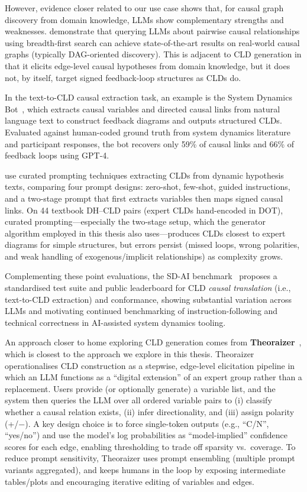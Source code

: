 However, evidence closer related to our use case shows that, for causal graph discovery from domain knowledge, LLMs show complementary strengths and weaknesses. \citet{jiralerspong2024efficientcausalgraphdiscovery} demonstrate that querying LLMs about pairwise causal relationships using breadth-first search can achieve state-of-the-art results on real-world causal graphs (typically DAG-oriented discovery). This is adjacent to CLD generation in that it elicits edge-level causal hypotheses from domain knowledge, but it does not, by itself, target signed feedback-loop structures as CLDs do.

In the text-to-CLD causal extraction task, an example is the System Dynamics Bot~\citep{hosseinichimeh2024textmapdynamicsbot}, which extracts causal variables and directed causal links from natural language text to construct feedback diagrams and outputs structured CLDs. Evaluated against human-coded ground truth from system dynamics literature and participant responses, the bot recovers only 59\% of causal links and 66\% of feedback loops using GPT-4.

\citet{liu2024leveraging} use curated prompting techniques extracting CLDs from dynamic hypothesis texts, comparing four prompt designs: zero-shot, few-shot, guided instructions, and a two-stage prompt that first extracts variables then maps signed causal links. On 44 textbook DH--CLD pairs (expert CLDs hand-encoded in DOT), curated prompting---especially the two-stage setup, which the generator algorithm employed in this thesis also uses---produces CLDs closest to expert diagrams for simple structures, but errors persist (missed loops, wrong polarities, and weak handling of exogenous/implicit relationships) as complexity grows.

Complementing these point evaluations, the SD-AI benchmark~\citep{schoenberg2025aibuildsdmodels} proposes a standardised test suite and public leaderboard for CLD \emph{causal translation} (i.e., text-to-CLD extraction) and conformance, showing substantial variation across LLMs and motivating continued benchmarking of instruction-following and technical correctness in AI-assisted system dynamics tooling.

An approach closer to home exploring CLD generation comes from \textbf{Theoraizer}~\citep{Waaijers2024theoraizer}, which is closest to the approach we explore in this thesis. Theoraizer operationalises CLD construction as a stepwise, edge-level elicitation pipeline in which an LLM functions as a ``digital extension'' of an expert group rather than a replacement. Users provide (or optionally generate) a variable list, and the system then queries the LLM over all ordered variable pairs to (i) classify whether a causal relation exists, (ii) infer directionality, and (iii) assign polarity (+/$-$). A key design choice is to force single-token outputs (e.g., ``C/N'', ``yes/no'') and use the model's log probabilities as ``model-implied'' confidence scores for each edge, enabling thresholding to trade off sparsity vs.\ coverage. To reduce prompt sensitivity, Theoraizer uses prompt ensembling (multiple prompt variants aggregated), and keeps humans in the loop by exposing intermediate tables/plots and encouraging iterative editing of variables and edges.

